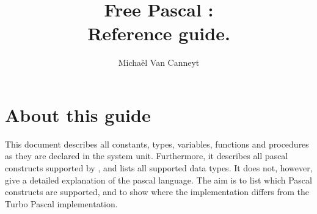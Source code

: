 %
%
%
%
%

%
%
\makeindex
%
%
\usepackage{syntax}

%
%

\title{Free Pascal :\\ Reference guide.}

\author{Micha\"el Van Canneyt}
\maketitle
\tableofcontents
\newpage
\listoftables
\newpage




\section*{About this guide}
This document describes all constants, types, variables, functions and
procedures as they are declared in the system unit.
Furthermore, it describes all pascal constructs supported by \fpc, and lists
all supported data types. It does not, however, give a detailed explanation
of the pascal language. The aim is to list which Pascal constructs are
supported, and to show where the \fpc implementation differs from the
Turbo Pascal implementation.
